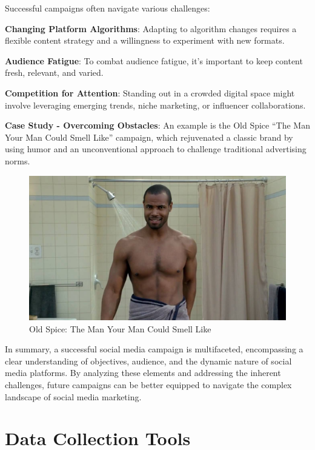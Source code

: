 \documentclass[
]{book}
\begin{document}
Successful campaigns often navigate various challenges:

\textbf{Changing Platform Algorithms}: Adapting to algorithm changes requires a flexible content strategy and a willingness to experiment with new formats.

\textbf{Audience Fatigue}: To combat audience fatigue, it's important to keep content fresh, relevant, and varied.

\textbf{Competition for Attention}: Standing out in a crowded digital space might involve leveraging emerging trends, niche marketing, or influencer collaborations.

\textbf{Case Study - Overcoming Obstacles}: An example is the Old Spice ``The Man Your Man Could Smell Like'' campaign, which rejuvenated a classic brand by using humor and an unconventional approach to challenge traditional advertising norms.

\begin{figure}
\centering
\includegraphics[width=1\textwidth,height=\textheight]{images/oldspice.jpg}
\caption{Old Spice: The Man Your Man Could Smell Like}
\end{figure}

In summary, a successful social media campaign is multifaceted, encompassing a clear understanding of objectives, audience, and the dynamic nature of social media platforms. By analyzing these elements and addressing the inherent challenges, future campaigns can be better equipped to navigate the complex landscape of social media marketing.

\hypertarget{data-collection-tools}{%
\chapter{Data Collection Tools}\label{data-collection-tools}}
\end{document}
